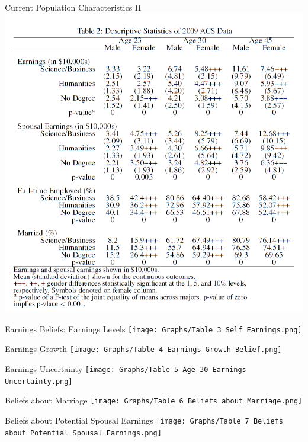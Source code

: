 \documentclass[12pt]{beamer}
\begin{document}
\begin{frame}{Current Population Characteristics II}
    \includegraphics[scale=0.4]{Table2.png}
\end{frame}

\begin{frame}{Earnings Beliefs: Earnings Levels}
    \texttt{[image: Graphs/Table 3 Self Earnings.png]}
\end{frame}

\begin{frame}{Earnings Growth}
    \texttt{[image: Graphs/Table 4 Earnings Growth Belief.png]}
\end{frame}

\begin{frame}{Earnings Uncertainty}
    \texttt{[image: Graphs/Table 5 Age 30 Earnings Uncertainty.png]}
\end{frame}

\begin{frame}{Beliefs about Marriage}
    \texttt{[image: Graphs/Table 6 Beliefs about Marriage.png]}
\end{frame}

\begin{frame}{Beliefs about Potential Spousal Earnings}
    \texttt{[image: Graphs/Table 7 Beliefs about Potential Spousal Earnings.png]}
\end{frame}
\end{document}
